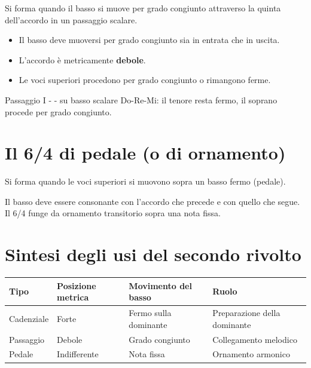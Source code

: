 \begin{definizione}[6/4 di passaggio]
    Si forma quando il basso si muove per grado congiunto attraverso la quinta dell'accordo in un passaggio scalare.
\end{definizione}

\begin{regola}
    \begin{itemize}
        \item Il basso deve muoversi per grado congiunto sia in entrata che in uscita.
        \item L'accordo è metricamente \textbf{debole}.
        \item Le voci superiori procedono per grado congiunto o rimangono ferme.
    \end{itemize}
\end{regola}

\begin{esempio}[6/4 di passaggio]
    Passaggio I -  -  su basso scalare Do-Re-Mi: il tenore resta fermo, il soprano procede per grado congiunto.
\end{esempio}

\section{Il 6/4 di pedale (o di ornamento)}
\label{sec:64_pedale}

\begin{definizione}[6/4 di pedale]
    Si forma quando le voci superiori si muovono sopra un basso fermo (pedale).
\end{definizione}

\begin{regola}
    Il basso deve essere consonante con l'accordo che precede e con quello che segue. Il 6/4 funge da ornamento transitorio sopra una nota fissa.
\end{regola}

\section{Sintesi degli usi del secondo rivolto}
\label{sec:sintesi_secondo_rivolto}

\begin{center}
\begin{tabular}{|l|l|l|l|}
\hline
Tipo & Posizione metrica & Movimento del basso & Ruolo \\
\hline
Cadenziale & Forte & Fermo sulla dominante & Preparazione della dominante \\
Passaggio & Debole & Grado congiunto & Collegamento melodico \\
Pedale & Indifferente & Nota fissa & Ornamento armonico \\
\hline
\end{tabular}
\end{center}
